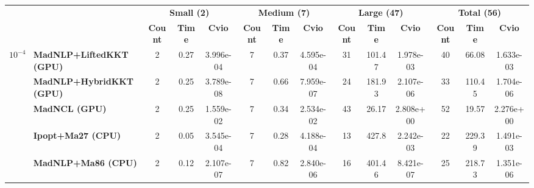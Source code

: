 \begin{center}
\renewcommand{\arraystretch}{0.9}
\begin{tabular}{|l|l|ccc|ccc|ccc|ccc|}
\hline
 & & \multicolumn{3}{c|}{\textbf{Small (2)}} & \multicolumn{3}{c|}{\textbf{Medium (7)}} & \multicolumn{3}{c|}{\textbf{Large (47)}} & \multicolumn{3}{c|}{\textbf{Total (56)}} \\
 & & \textbf{Count} & \textbf{Time} & \textbf{Cvio} & \textbf{Count} & \textbf{Time} & \textbf{Cvio} & \textbf{Count} & \textbf{Time} & \textbf{Cvio} & \textbf{Count} & \textbf{Time} & \textbf{Cvio}\\
\hline
\multirow{5}{*}{\Large\textbf{$10^{-4}$}} & \textbf{MadNLP+LiftedKKT (GPU)} & \cellcolor{blue!15}2 & 0.27 & 3.996e-04 & \cellcolor{blue!15}7 & 0.37 & 4.595e-04 & 31 & 101.47 & 1.978e-03 & 40 & 66.08 & 1.633e-03 \\
 & \textbf{MadNLP+HybridKKT (GPU)} & \cellcolor{blue!15}2 & 0.25 & \cellcolor{blue!15}3.789e-08 & \cellcolor{blue!15}7 & 0.66 & \cellcolor{blue!15}7.959e-07 & 24 & 181.93 & 2.107e-06 & 33 & 110.45 & 1.704e-06 \\
 & \textbf{MadNCL (GPU)} & \cellcolor{blue!15}2 & 0.25 & 1.559e-02 & \cellcolor{blue!15}7 & 0.34 & 2.534e-02 & \cellcolor{blue!15}43 & \cellcolor{blue!15}26.17 & 2.808e+00 & \cellcolor{blue!15}52 & \cellcolor{blue!15}19.57 & 2.276e+00 \\
 & \textbf{Ipopt+Ma27 (CPU)} & \cellcolor{blue!15}2 & \cellcolor{blue!15}0.05 & 3.545e-04 & \cellcolor{blue!15}7 & \cellcolor{blue!15}0.28 & 4.188e-04 & 13 & 427.8 & 2.242e-03 & 22 & 229.39 & 1.491e-03 \\
 & \textbf{MadNLP+Ma86 (CPU)} & \cellcolor{blue!15}2 & 0.12 & 2.107e-07 & \cellcolor{blue!15}7 & 0.82 & 2.840e-06 & 16 & 401.46 & \cellcolor{blue!15}8.421e-07 & 25 & 218.73 & \cellcolor{blue!15}1.351e-06 \\
\hline
\end{tabular}
\end{center}
